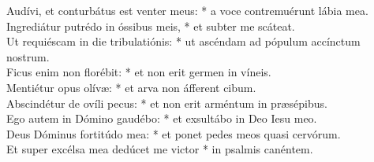 {	Audívi, et conturbátus est venter meus: * a voce contremuérunt lábia mea. \\
	Ingrediátur putrédo in óssibus meis, * et subter me scáteat. \\
	Ut requiéscam in die tribulatiónis: * ut ascéndam ad pópulum accínctum nostrum. \\
	Ficus enim non florébit: * et non erit germen in víneis. \\
	Mentiétur opus olívæ: * et arva non áfferent cibum. \\
	Abscindétur de ovíli pecus: * et non erit arméntum in præsépibus. \\
	Ego autem in Dómino gaudébo: * et exsultábo in Deo Iesu meo. \\
	Deus Dóminus fortitúdo mea: * et ponet pedes meos quasi cervórum. \\
	Et super excélsa mea dedúcet me victor * in psalmis canéntem.
}

